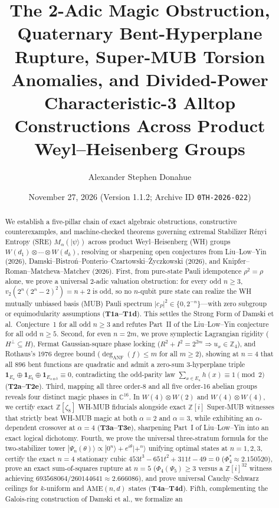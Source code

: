 \documentclass[11pt,reqno]{amsart}
\title[Weyl--Heisenberg Magic Obstructions and Torsion Anomalies]{%
The 2-Adic Magic Obstruction, Quaternary Bent-Hyperplane Rupture,
Super-MUB Torsion Anomalies, and Divided-Power Characteristic-3 Alltop
Constructions Across Product Weyl--Heisenberg Groups}
\author{Alexander Stephen Donahue}
\date{November 27, 2026 (Version 1.1.2; Archive ID \texttt{0TH-2026-022})}
\theoremstyle{definition}
\newcommand{\Z}{\mathbb{Z}}
\newcommand{\C}{\mathbb{C}}
\begin{document}
\begin{abstract}
We establish a five-pillar chain of exact algebraic obstructions, constructive
counterexamples, and machine-checked theorems governing extremal Stabilizer R\'enyi
Entropy (SRE) $M_\alpha(|\psi\rangle)$ across product Weyl--Heisenberg (WH) groups
$W(d_1)\otimes\cdots\otimes W(d_k)$, resolving or sharpening open conjectures from
Liu--Low--Yin (2026), Damski--Bistro\'n--Ponterio--Czartowski--\.Zyczkowski (2026),
and Knipfer--Roman--Matcheva--Matchev (2026).
First, from pure-state Pauli idempotence $\rho^2=\rho$ alone, we prove a universal
2-adic valuation obstruction: for every odd $n\ge 3$, $v_2(2^n(2^n-2)^2)=n+2$ is odd,
so no $n$-qubit pure state can realize the WH mutually unbiased basis (MUB) Pauli
spectrum $|c_P|^2\in\{0,2^{-n}\}$---with zero subgroup or equimodularity assumptions
(\textbf{T1a--T1d}). This settles the Strong Form of Damski et al.\ Conjecture~1 for
all odd $n\ge 3$ and refutes Part~II of the Liu--Low--Yin conjecture for all odd
$n\ge 5$.
Second, for even $n=2m$, we prove symplectic Lagrangian rigidity ($H^\perp\subseteq H$),
Fermat Gaussian-square phase locking ($R^2+I^2=2^{2m}\Rightarrow u_x\in\Z_4$), and
Rothaus's 1976 degree bound ($\deg_{\mathrm{ANF}}(f)\le m$ for all $m\ge 2$), showing
at $n=4$ that all $896$ bent functions are quadratic and admit a zero-sum 3-hyperplane
triple $\mathbf{1}_{E_a}\oplus\mathbf{1}_{E_b}\oplus\mathbf{1}_{E_{a\oplus b}}\equiv 0$,
contradicting the odd-parity law $\sum_{x\in E_a}h(x)\equiv 1\pmod 2$ (\textbf{T2a--T2e}).
Third, mapping all three order-8 and all five order-16 abelian groups reveals four
distinct magic phases in $\C^{16}$. In $W(4)\otimes W(2)$ and $W(4)\otimes W(4)$, we
certify exact $\Z[\zeta_8]$ WH-MUB fiducials alongside exact $\Z[i]$ Super-MUB witnesses
that strictly beat WH-MUB magic at both $\alpha=2$ and $\alpha=3$, while exhibiting an
$\alpha$-dependent crossover at $\alpha=4$ (\textbf{T3a--T3e}), sharpening Part~I of
Liu--Low--Yin into an exact logical dichotomy.
Fourth, we prove the universal three-stratum formula for the two-stabilizer tower
$|\Psi_n(\theta)\rangle\propto|0^n\rangle+e^{i\theta}|+^n\rangle$ unifying optimal
states at $n=1,2,3$, certify the exact $n=4$ stationary cubic
$453t^3-651t^2+311t-49=0$ ($\Phi_4^*\approx 2.150520$), prove an exact sum-of-squares
rupture at $n=5$ ($\Phi_4(\Psi_5)\ge 3$ versus a $\Z[i]^{32}$ witness achieving
$693568064/260144641\approx 2.666086$), and prove universal Cauchy--Schwarz ceilings
for $k$-uniform and $\mathrm{AME}(n,d)$ states (\textbf{T4a--T4d}).
Fifth, complementing the Galois-ring construction of Damski et al., we formalize an

\end{abstract}
\end{document}
